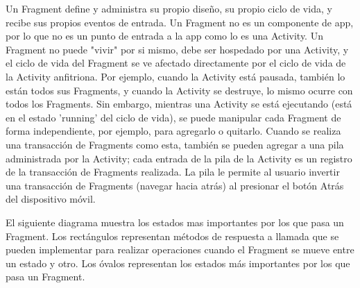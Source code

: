 Un Fragment define y administra su propio diseño, su propio ciclo de vida, y recibe sus propios eventos de entrada. Un Fragment no es un componente de app, por lo que no es un punto de entrada a la app como lo es una Activity. Un Fragment no puede "vivir" por si mismo, debe ser hospedado por una Activity, y el ciclo de vida del Fragment se ve afectado directamente por el ciclo de vida de la Activity anfitriona. Por ejemplo, cuando la Activity está pausada, también lo están todos sus Fragments, y cuando la Activity se destruye, lo mismo ocurre con todos los Fragments. Sin embargo, mientras una Activity se está ejecutando (está en el estado 'running' del ciclo de vida), se puede manipular cada Fragment de forma independiente, por ejemplo, para agregarlo o quitarlo. Cuando se realiza una transacción de Fragments como esta, también se pueden agregar a una pila administrada por la Activity; cada entrada de la pila de la Activity es un registro de la transacción de Fragments realizada. La pila le permite al usuario invertir una transacción de Fragments (navegar hacia atrás) al presionar el botón Atrás del dispositivo móvil.

El siguiente diagrama muestra los estados mas importantes por los que pasa un Fragment. Los rectángulos representan métodos de respuesta a llamada que se pueden implementar para realizar operaciones cuando el Fragment se mueve entre un estado y otro. Los óvalos representan los estados más importantes por los que pasa un Fragment.


